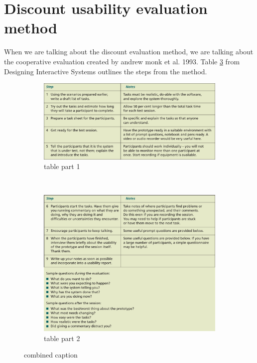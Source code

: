 \section{Discount usability evaluation method}
When we are talking about the discount evaluation method, we are talking about the cooperative evaluation created by andrew monk et al. 1993\cite{AndrewMonk}. Table \ref{fig:UsabilityTable} from Designing Interactive Systems\cite{CooperativeEval} outlines the steps from the method.

\begin{figure}[]
  \centering      
    \begin{subfigure}[b]{\textwidth}
    \begin{center}
      \includegraphics[scale=0.5]{./pics/UsabilityTableP1}
      \caption{table part 1}
      \label{fig:UsabilityTableP1}
    \end{center}
    \end{subfigure}
    ~\\
    \begin{subfigure}[b]{\textwidth}
    \begin{center}
      \includegraphics[scale=0.5]{./pics/UsabilityTableP2}
      \caption{table part 2}
      \label{fig:UsabilityTableP2}
    \end{center}
    \end{subfigure}
    \caption{combined caption}
    \label{fig:UsabilityTable}
\end{figure}

